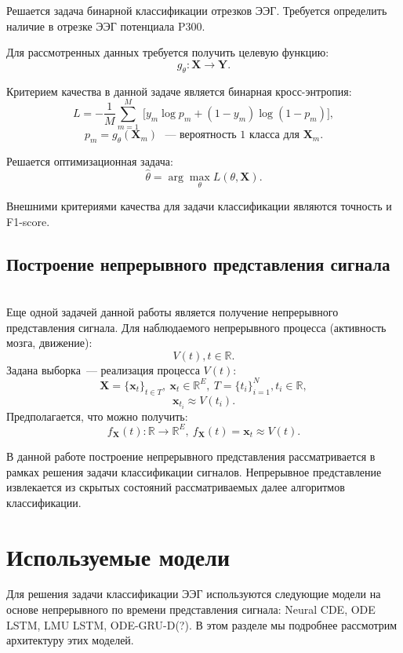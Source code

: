 \documentclass{article}
\newcommand{\x}{\mathbf{x}}
\newcommand{\Y}{\mathbf{Y}}
\newcommand{\X}{\mathbf{X}}
\newcommand{\R}{\mathbb{R}}
\begin{document}
    Решается задача бинарной классификации отрезков ЭЭГ. Требуется определить наличие в отрезке ЭЭГ потенциала P300.
    
    Для рассмотренных данных требуется получить целевую функцию:
    $$g_{\theta}: \X \to \Y.$$
    
    Критерием качества в данной задаче является бинарная кросс-энтропия: 
    $$L =  -{\frac {1}{M}}\sum _{m=1}^{M}\ {\bigg [}y_{m}\log {p}_{m}+(1-y_{m})\log(1-{p}_{m}){\bigg ]},$$
    $$p_m = g_{\theta}(\X_m) \text{ ~--- вероятность 1 класса для } \X_m.$$

    Решается оптимизационная задача:
    \begin{equation*}
    \hat{\theta} = \arg\max_{\theta} L(\theta, \X).
    \end{equation*}
    
    Внешними критериями качества для задачи классификации являются точность и F1-score.
    
\subsection{Построение непрерывного представления сигнала}\\
    
    Еще одной задачей данной работы является получение непрерывного представления сигнала. 
    Для наблюдаемого непрерывного процесса (активность мозга, движение):
    $$V(t), t \in \R.$$
    Задана выборка~--- реализация процесса $V(t)$:
    $$\X = \{\x_t\}_{t\in T},\  \x_t \in \R^E,\  T = \{t_i\}_{i=1}^{N}, t_i \in \R,$$ 
    $$\x_{t_i} \approx V(t_i).$$
    Предполагается, что можно получить:
    $$f_{\X}(t): \R \to \R^E, \ f_{\X}(t) = \x_t \approx V(t).$$

    В данной работе построение непрерывного представления рассматривается в рамках решения задачи классификации сигналов. Непрерывное представление извлекается из скрытых состояний рассматриваемых далее алгоритмов классификации.
    

\section{Используемые модели}

Для решения задачи классификации ЭЭГ используются следующие модели на основе непрерывного по времени представления сигнала: Neural CDE\cite{cde},  ODE LSTM\cite{lechner2020longterm}, LMU LSTM\cite{NEURIPS2019_952285b9}, ODE-GRU-D\cite{Habiba2020NeuralOF}(?). В этом разделе мы подробнее рассмотрим архитектуру этих моделей.
\end{document}
